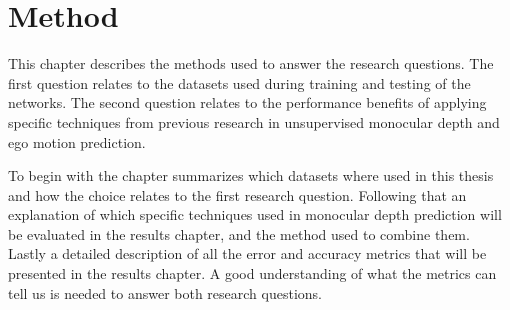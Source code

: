 \chapter{Method}\label{cha:method}

This chapter describes the methods used to answer the research questions. The first question relates to the datasets used during training and testing of the networks. The second question relates to the performance benefits of applying specific techniques from previous research in unsupervised monocular depth and ego motion prediction.

To begin with the chapter summarizes which datasets where used in this thesis and how the choice relates to the first research question. Following that an explanation of which specific techniques used in monocular depth prediction will be evaluated in the results chapter, and the method used to combine them. Lastly a detailed description of all the error and accuracy metrics that will be presented in the results chapter. A good understanding of what the metrics can tell us is needed to answer both research questions.







